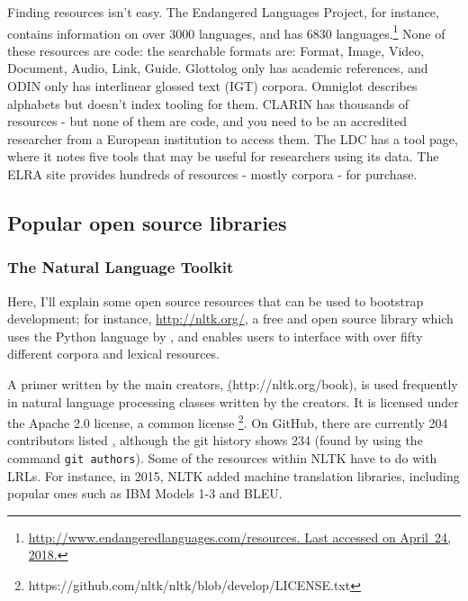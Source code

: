 Finding resources isn't easy. The Endangered Languages Project, for instance, contains information on over 3000 languages, and has 6830 languages.\footnote{\href{http://www.endangeredlanguages.com/resources/}{http://www.endangeredlanguages.com/resources. Last accessed on April~24, 2018.}} None of these resources are code: the searchable formats are: Format, Image, Video, Document, Audio, Link, Guide. Glottolog only has academic references, and ODIN only has interlinear glossed text (IGT) corpora. Omniglot describes alphabets but doesn't index tooling for them. CLARIN has thousands of resources - but none of them are code, and you need to be an accredited researcher from a European institution to access them. The LDC has a tool page, where it notes five tools that may be useful for researchers using its data. The ELRA site provides hundreds of resources - mostly corpora - for purchase.



\subsection{Popular open source libraries}
\label{subsec:popular-open-source-libraries}

\subsubsection{The Natural Language Toolkit}
Here, I'll explain some open source resources that can be used to bootstrap development; for instance, \href{NLTK (Natural Language Toolkit)}{http://nltk.org/}, a free and open source library which uses the Python language by \citet{bird2006nltk}, and enables users to interface with over fifty different corpora and lexical resources.

A primer written by the main creators, \href{Natural Language Processing with Python}(http://nltk.org/book), is used frequently in natural language processing classes written by the creators. It is licensed under the Apache 2.0 license, a common license \footnote{https://github.com/nltk/nltk/blob/develop/LICENSE.txt}. On GitHub, there are currently 204 contributors listed \href{https://github.com/nltk/nltk/graphs/contributors}, although the git history shows 234 (found by using the command {\tt git authors}).%
Some of the resources within NLTK have to do with LRLs. For instance, in 2015, NLTK added machine translation libraries, including popular ones such as IBM Models 1-3 and BLEU.

